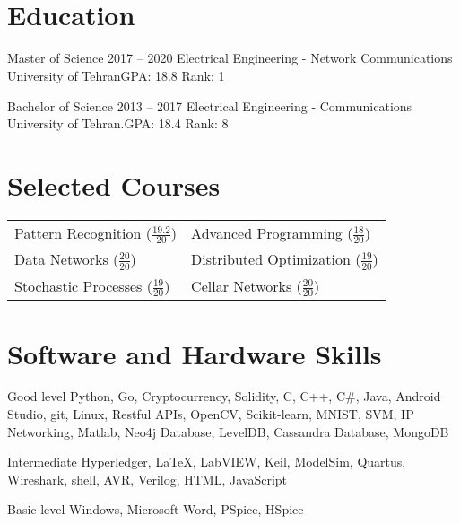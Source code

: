 \documentclass{tccv}
\begin{document}
	\textbf{\\ \\}
	
	\section{Education}
	\begin{yearlist}
		\item[Master of Science]{2017 -- 2020}
		{Electrical Engineering - Network Communications}
		{University of Tehran\newline GPA: 18.8 \newline Rank: 1}
		
		\item[Bachelor of Science]{2013 -- 2017}
		{Electrical Engineering - Communications}
		{University of Tehran.\newline GPA: 18.4 \newline Rank: 8}
	\end{yearlist}
	
	\section{Selected Courses}
	\begin{tabular}{ll}
		Pattern Recognition ($\frac{19.2}{20}$)	&Advanced Programming ($\frac{18}{20}$) \\
		Data Networks ($\frac{20}{20}$)			&Distributed Optimization ($\frac{19}{20}$) \\
		Stochastic Processes ($\frac{19}{20}$)	&Cellar Networks ($\frac{20}{20}$)
	\end{tabular}
	
	\section{Software and Hardware Skills}
	\begin{factlist}
		
		\item{Good level}
		{Python, Go, Cryptocurrency, Solidity, C, C++, C\#, Java, Android Studio, git, Linux, Restful APIs, OpenCV, Scikit-learn, MNIST, SVM, IP Networking, Matlab, Neo4j Database, LevelDB, Cassandra Database, MongoDB}
		
		\item{Intermediate}
		{Hyperledger, \LaTeX, LabVIEW, Keil, ModelSim, Quartus,
			Wireshark, shell, AVR, Verilog, HTML, JavaScript}
		
		\item{Basic level}
		{Windows, Microsoft Word, PSpice, HSpice}
		
	\end{factlist}
	
\end{document}
